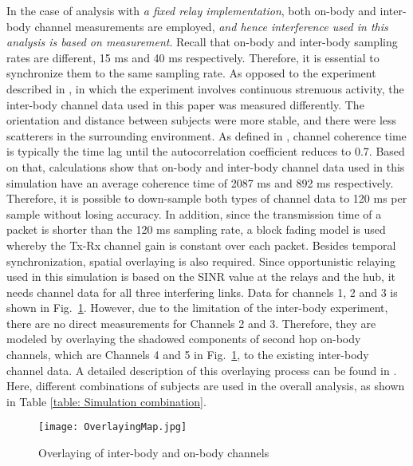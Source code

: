 \documentclass[12pt,draftcls,a4paper,onecolumn,journal]{IEEEtran}
\begin{document}
In the case of analysis with \emph{a fixed relay implementation}, both on-body and inter-body channel measurements are employed, \emph{and hence interference used in this analysis is based on measurement}. Recall that on-body and inter-body sampling rates are different, 15 ms and 40 ms respectively. Therefore, it is essential to synchronize them to the same sampling rate. As opposed to the experiment described in \cite{David:ElecLetter:2009}, in which the experiment involves continuous strenuous activity, the inter-body channel data used in this paper was measured differently. The orientation and distance between subjects were more stable, and there were less scatterers in the surrounding environment. As defined in \cite{Paulraj:2008}, channel coherence time is typically the time lag until the autocorrelation coefficient reduces to 0.7. Based on that, calculations show that on-body and inter-body channel data used in this simulation have an average coherence time of 2087 ms and 892 ms respectively. Therefore, it is possible to down-sample both types of channel data to 120 ms per sample without losing accuracy. In addition, since the transmission time of a packet is shorter than the 120 ms sampling rate, a block fading model is used whereby the Tx-Rx channel gain is constant over each packet. Besides temporal synchronization, spatial overlaying is also required. Since opportunistic relaying used in this simulation is based on the SINR value at the relays and the hub, it needs channel data for all three interfering links. Data for channels 1, 2 and 3 is shown in Fig.~\ref{fig: Overlaying}. However, due to the limitation of the inter-body experiment, there are no direct measurements for Channels 2 and 3. Therefore, they are modeled by overlaying the shadowed components of second hop on-body channels, which are Channels 4 and 5 in Fig.~\ref{fig: Overlaying}, to the existing inter-body channel data. A detailed description of this overlaying process can be found in \cite{Dong:ICC:2013}. Here, different combinations of subjects are used in the overall analysis, as shown in Table \ref{table: Simulation combination}.


\begin{figure}[]
\centering
\texttt{[image: OverlayingMap.jpg]}
\caption{Overlaying of inter-body and on-body channels}
\label{fig: Overlaying}
\end{figure}
\end{document}
